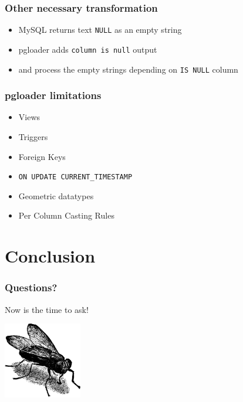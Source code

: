 \documentclass{beamer}
\begin{document}
\begin{frame}[fragile]
  \frametitle{Other necessary transformation}
  
  \vfill

  \begin{itemize}
  \item MySQL returns text \texttt{NULL} as an empty string
  \item pgloader adds \texttt{column is null} output
  \item and process the empty strings depending on \texttt{IS NULL} column
  \end{itemize}
\end{frame}

\begin{frame}[fragile]
  \frametitle{pgloader limitations}
  
  \vfill

  \begin{itemize}
  \item Views
  \item Triggers
  \item Foreign Keys
  \item \texttt{ON UPDATE CURRENT\_TIMESTAMP}
  \item Geometric datatypes
  \item Per Column Casting Rules
  \end{itemize}
\end{frame}

\section{Conclusion}

\begin{frame}
  \frametitle{Questions?}

\begin{center}
  Now is the time to ask!
  \vfill

  \includegraphics[height=9em]{fly.png}
\end{center}
\end{frame}
\end{document}
